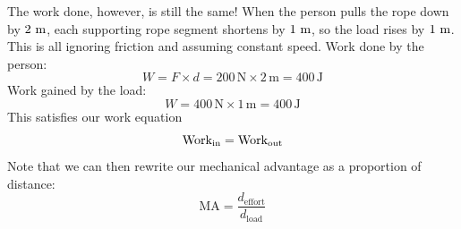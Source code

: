 The work done, however, is still the same! When the person pulls the rope down by $2 \ \text m$, each supporting rope segment shortens by $1 \ \text m$, so the load rises by $1 \ \text m$. This is all ignoring friction and assuming constant speed.
Work done by the person:
$$W = F \times d = 200\,\text{N} \times 2\,\text{m} = 400\,\text{J}$$
Work gained by the load:
$$W = 400\,\text{N} \times 1\,\text{m} = 400\,\text{J}$$
This satisfies our work equation 
\begin{equation}
    \rm Work_{in} = Work_{out}
\end{equation}
Note that we can then rewrite our mechanical advantage as a proportion of distance:
\begin{equation}
    \text{MA} = \frac{d_{\text{effort}}}{d_{\text{load}}}
\end{equation}

